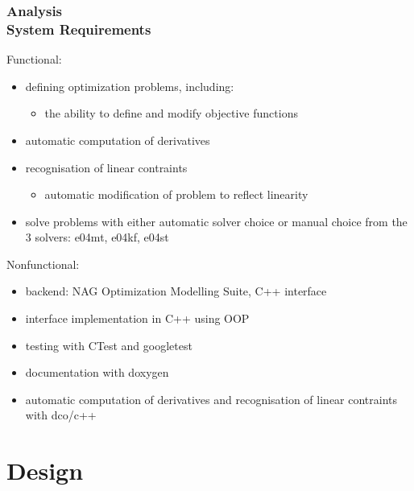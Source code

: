 \documentclass[ucs,10pt]{beamer}
\begin{document}
\begin{frame}
\frametitle{Analysis \\
\small \color{rwth-blue} System Requirements}

Functional:
\begin{itemize}
\item defining optimization problems, including:
	\begin{itemize}
	\item the ability to define and modify objective functions
	\end{itemize}
\item automatic computation of derivatives
\item recognisation of linear contraints
	\begin{itemize}
	\item automatic modification of problem to reflect linearity
	\end{itemize}
\item solve problems with either automatic solver choice or manual choice from the 3 solvers: e04mt, e04kf, e04st
\end{itemize}
Nonfunctional:
\begin{itemize}
\item backend: NAG Optimization Modelling Suite, C++ interface
\item interface implementation in C++ using OOP
\item testing with CTest and googletest
\item documentation with doxygen
\item automatic computation of derivatives and recognisation of linear contraints with dco/c++
\end{itemize}
\end{frame}


\section{Design}
\end{document}
